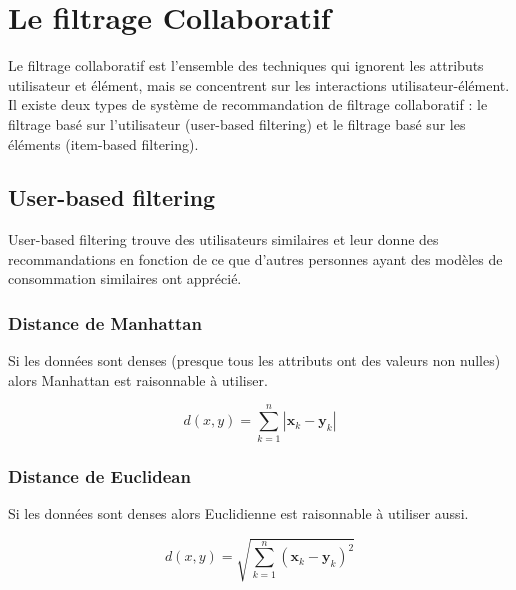 \documentclass[11pt,fleqn]{book} %
\begin{document}
\chapter{Le filtrage Collaboratif}
Le filtrage collaboratif est l’ensemble des techniques qui ignorent les attributs utilisateur et élément, mais se concentrent sur les interactions utilisateur-élément. Il existe deux types de système de recommandation de filtrage collaboratif : le filtrage basé sur l’utilisateur (user-based filtering) et le filtrage basé sur les éléments (item-based filtering).
\section{User-based filtering}
User-based filtering trouve des utilisateurs similaires et leur donne des recommandations en fonction de ce que d'autres personnes ayant des modèles de consommation similaires ont apprécié.
\subsection{Distance de Manhattan}
Si les données sont denses (presque tous les attributs ont des valeurs non nulles) alors Manhattan est raisonnable à utiliser.
\vspace{2mm}
\begin{theorem}
$$
d(x,y) = \sum_{k=1}^n|\mathbf{x}_k - \mathbf{y}_k|
$$
\end{theorem}
\subsection{Distance de Euclidean}
Si les données sont denses alors Euclidienne est raisonnable à utiliser aussi.
\vspace{2mm}
\begin{theorem}
$$
d(x,y) =\sqrt{\sum_{k=1}^n(\mathbf{x}_k - \mathbf{y}_k)^2}
$$
\end{theorem}
\vspace{2mm}
\end{document}
